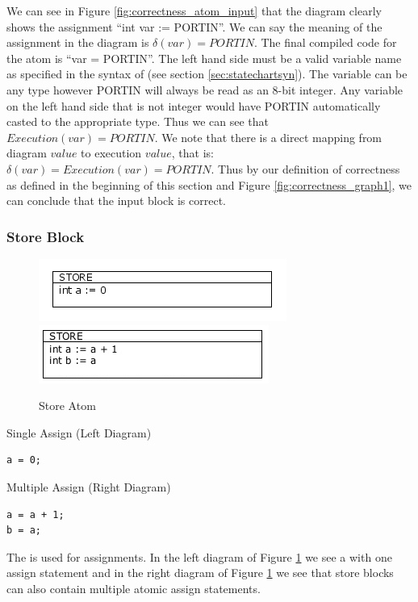 We can see in Figure \ref{fig:correctness_atom_input} that the diagram clearly shows
the assignment ``int var := PORTIN''. We can say the meaning of the assignment in 
the diagram is $\delta(var) = PORTIN$. The final compiled code for the atom is 
``var = PORTIN''. The left hand side must be a valid variable name as specified 
in the syntax of \plccharts (see section \ref{sec:statechartsyn}). 
The variable can be any type however PORTIN will always be read as an 8-bit integer. 
Any variable on the left hand side that is not integer would have PORTIN 
automatically casted to the appropriate type. Thus we can see that 
$Execution(var) = PORTIN$. We note that there is a direct mapping from diagram
$value$ to execution $value$, that is: $\delta(var) = Execution(var) = PORTIN$. 
Thus by our definition of correctness as defined in the beginning of this 
section and Figure \ref{fig:correctness_graph1}, we can conclude that 
the input block is correct.


\subsubsection{Store Block}

\begin{figure}[h]
	\centering
	\includegraphics[width=\imgmedphoto]{./images/correctness_atom_store_single.png}
	\includegraphics[width=\imgmedphoto]{./images/correctness_atom_store.png}
	\caption{Store Atom}
	\label{fig:correctness_atom_store}
\end{figure}

Single Assign (Left Diagram)
\begin{lstlisting}[frame=single]
a = 0;
\end{lstlisting}

Multiple Assign (Right Diagram)
\begin{lstlisting}[frame=single]
a = a + 1;
b = a;
\end{lstlisting}

The  is used for assignments. In the left diagram of 
Figure \ref{fig:correctness_atom_store} we see a  with one 
assign statement and in the right diagram of Figure \ref{fig:correctness_atom_store} we see 
that store blocks can also contain multiple atomic assign statements. 

